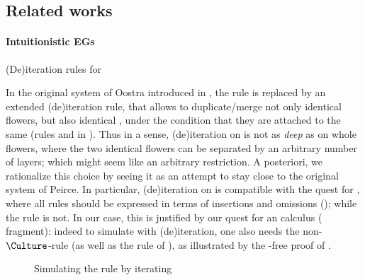 \begin{scope}
\subsection{Related works}

\paragraph{Intuitionistic EGs}
 
\begin{marginfigure}
  \caption{(De)iteration rules for }
\end{marginfigure}

In the original  system of Oostra introduced in
, the  rule is replaced by an extended
(de)iteration rule, that allows to duplicate/merge not only identical flowers,
but also identical \emph{}, under the condition that they are
attached to the same  (rules
 and  in ). Thus in a sense,
(de)iteration on  is not as \emph{deep} as on whole flowers, where
the two identical flowers can be separated by an arbitrary number of layers;
which might seem like an arbitrary restriction. A posteriori, we rationalize
this choice by seeing it as an attempt to stay close to the original system
 of Peirce. In particular, (de)iteration on  is compatible
with the quest for \emph{}, where all rules should be
expressed in terms of insertions and omissions (); while the
 rule is not. In our case, this is justified by our quest for an
\emph{} calculus ( fragment): indeed to simulate
 with  (de)iteration, one also needs the non-
$\Culture$-rule  (as well as the rule  of
), as illustrated by the -free proof of
.

\begin{figure}
  
  \caption{Simulating the  rule by iterating }
\end{figure}


\end{scope}
